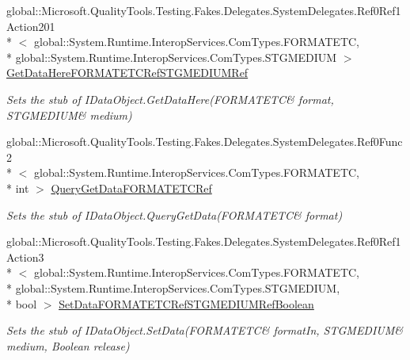 \begin{DoxyCompactItemize}
global\-::\-Microsoft.\-Quality\-Tools.\-Testing.\-Fakes.\-Delegates.\-System\-Delegates.\-Ref0\-Ref1\-Action201\\*
$<$ global\-::\-System.\-Runtime.\-Interop\-Services.\-Com\-Types.\-F\-O\-R\-M\-A\-T\-E\-T\-C, \\*
global\-::\-System.\-Runtime.\-Interop\-Services.\-Com\-Types.\-S\-T\-G\-M\-E\-D\-I\-U\-M $>$ \hyperlink{class_system_1_1_runtime_1_1_interop_services_1_1_com_types_1_1_fakes_1_1_stub_i_data_object_ac3c016fb8b1cea2488b3db7994d0eb9b}{Get\-Data\-Here\-F\-O\-R\-M\-A\-T\-E\-T\-C\-Ref\-S\-T\-G\-M\-E\-D\-I\-U\-M\-Ref}
\begin{DoxyCompactList}\small\item\em Sets the stub of I\-Data\-Object.\-Get\-Data\-Here(F\-O\-R\-M\-A\-T\-E\-T\-C\& format, S\-T\-G\-M\-E\-D\-I\-U\-M\& medium)\end{DoxyCompactList}\item 
global\-::\-Microsoft.\-Quality\-Tools.\-Testing.\-Fakes.\-Delegates.\-System\-Delegates.\-Ref0\-Func2\\*
$<$ global\-::\-System.\-Runtime.\-Interop\-Services.\-Com\-Types.\-F\-O\-R\-M\-A\-T\-E\-T\-C, \\*
int $>$ \hyperlink{class_system_1_1_runtime_1_1_interop_services_1_1_com_types_1_1_fakes_1_1_stub_i_data_object_ae7dd37d4b511d29eb57704d2013fee08}{Query\-Get\-Data\-F\-O\-R\-M\-A\-T\-E\-T\-C\-Ref}
\begin{DoxyCompactList}\small\item\em Sets the stub of I\-Data\-Object.\-Query\-Get\-Data(F\-O\-R\-M\-A\-T\-E\-T\-C\& format)\end{DoxyCompactList}\item 
global\-::\-Microsoft.\-Quality\-Tools.\-Testing.\-Fakes.\-Delegates.\-System\-Delegates.\-Ref0\-Ref1\-Action3\\*
$<$ global\-::\-System.\-Runtime.\-Interop\-Services.\-Com\-Types.\-F\-O\-R\-M\-A\-T\-E\-T\-C, \\*
global\-::\-System.\-Runtime.\-Interop\-Services.\-Com\-Types.\-S\-T\-G\-M\-E\-D\-I\-U\-M, \\*
bool $>$ \hyperlink{class_system_1_1_runtime_1_1_interop_services_1_1_com_types_1_1_fakes_1_1_stub_i_data_object_a4df5eebe45c287101d55a565e8b79923}{Set\-Data\-F\-O\-R\-M\-A\-T\-E\-T\-C\-Ref\-S\-T\-G\-M\-E\-D\-I\-U\-M\-Ref\-Boolean}
\begin{DoxyCompactList}\small\item\em Sets the stub of I\-Data\-Object.\-Set\-Data(F\-O\-R\-M\-A\-T\-E\-T\-C\& format\-In, S\-T\-G\-M\-E\-D\-I\-U\-M\& medium, Boolean release)\end{DoxyCompactList}\end{DoxyCompactItemize}


